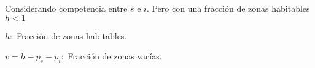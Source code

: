 \documentclass[twocolumn,aps,prl]{revtex4-1}
\begin{document}







Considerando competencia entre $s$ e $i$. Pero con una fracción de zonas habitables $h<1$ 

$h:$ Fracción de zonas habitables.

$v=h-p_{s}-p_{i}:$ Fracción de zonas vacías.

\end{document}

